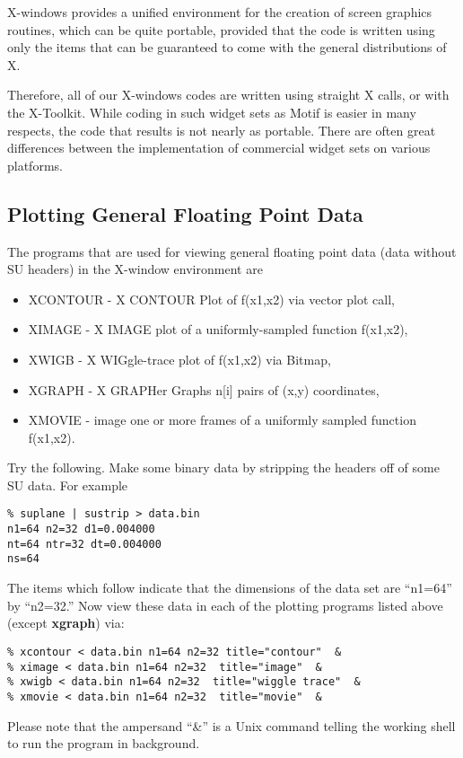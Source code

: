 {{{X-windows provides a unified environment for the creation of
screen graphics routines, which can be quite portable,
provided that the code is written using only the items that
can be guaranteed to come with the general distributions of X.

Therefore, all of our X-windows codes are written using straight
X calls, or with the X-Toolkit. While coding in such widget sets
as Motif is easier in many respects, the code that results
is not nearly as portable. There are often great differences
between the implementation of commercial widget sets on various
platforms.

\subsection{Plotting General Floating Point Data}

The programs that are used for viewing general floating point
data (data without SU headers) in the X-window environment are
\begin{itemize}
\item XCONTOUR - X CONTOUR Plot of f(x1,x2) via vector plot call,
\item XIMAGE - X IMAGE plot of a uniformly-sampled function f(x1,x2),
\item XWIGB - X WIGgle-trace plot of f(x1,x2) via Bitmap,
\item XGRAPH - X GRAPHer Graphs n[i] pairs of (x,y) coordinates,
\item XMOVIE - image one or more frames of a uniformly sampled 
function f(x1,x2).
\end{itemize}

Try the following. Make some binary data by stripping the headers
off of some SU data. For example
{\small\begin{verbatim}
% suplane | sustrip > data.bin
n1=64 n2=32 d1=0.004000
nt=64 ntr=32 dt=0.004000
ns=64
\end{verbatim}\noindent
The items which follow indicate that the dimensions of the data
set are ``n1=64'' by ``n2=32.''
Now view these data in each of the plotting programs listed above
(except {\bf xgraph}) via:
{\small\begin{verbatim}
% xcontour < data.bin n1=64 n2=32 title="contour"  &
% ximage < data.bin n1=64 n2=32  title="image"  &
% xwigb < data.bin n1=64 n2=32  title="wiggle trace"  &
% xmovie < data.bin n1=64 n2=32  title="movie"  &
\end{verbatim}}\noindent
Please note that the ampersand ``\&'' is a Unix command
telling the working shell to run the program in background.

}}}}
